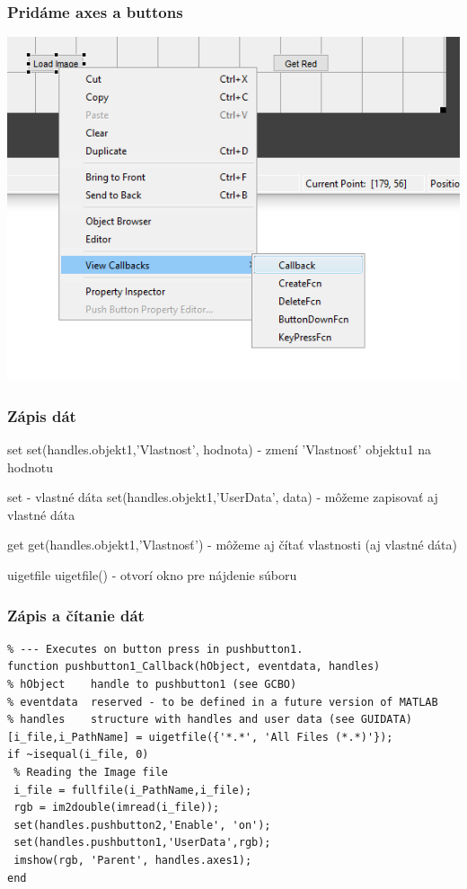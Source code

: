 \documentclass{beamer}
\begin{document}
\begin{frame}
  \frametitle{Pridáme axes a buttons}
  \centering
  \includegraphics[width=\textwidth, height=0.8\textheight,keepaspectratio]{screens/callbacks.png}
\end{frame}

\begin{frame}
  \frametitle{Zápis dát}
  \begin{block}{set}
  set(handles.objekt1,'Vlastnost', hodnota) - zmení 'Vlastnosť' objektu1 na hodnotu
 \end{block}
 
   \begin{block}{set - vlastné dáta}
  set(handles.objekt1,'UserData', data) - môžeme zapisovať aj vlastné dáta
 \end{block}
 
   \begin{block}{get}
  get(handles.objekt1,'Vlastnosť') - môžeme aj čítať vlastnosti (aj vlastné dáta)
 \end{block}

   \begin{block}{uigetfile}
  uigetfile() - otvorí okno pre nájdenie súboru
 \end{block}
\end{frame}

\begin{frame}[fragile]
  \frametitle{Zápis a čítanie dát}
  \begin{verbatim}
% --- Executes on button press in pushbutton1.
function pushbutton1_Callback(hObject, eventdata, handles)
% hObject    handle to pushbutton1 (see GCBO)
% eventdata  reserved - to be defined in a future version of MATLAB
% handles    structure with handles and user data (see GUIDATA)
[i_file,i_PathName] = uigetfile({'*.*', 'All Files (*.*)'});
if ~isequal(i_file, 0)
 % Reading the Image file
 i_file = fullfile(i_PathName,i_file);
 rgb = im2double(imread(i_file));
 set(handles.pushbutton2,'Enable', 'on');
 set(handles.pushbutton1,'UserData',rgb);
 imshow(rgb, 'Parent', handles.axes1);
end \end{verbatim}
\end{frame}
\end{document}
